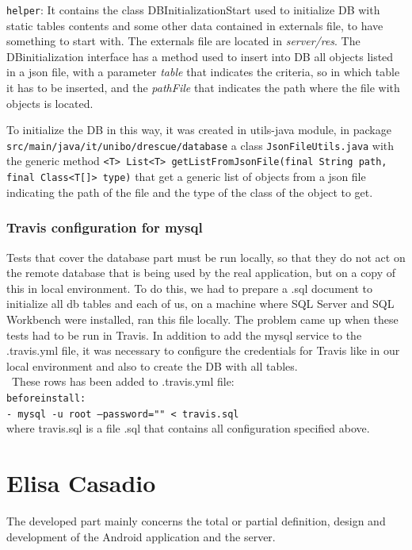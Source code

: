 \documentclass[a4paper,12pt]{report}
\begin{document}
\texttt{helper}: It contains the class DBInitializationStart used to initialize DB with static tables contents and some other data contained in externals file, to have something to start with.
The externals file are located in \textit{server/res}. The DBinitialization interface has a method used to insert into DB all objects listed in a json file, with a parameter \textit{table} that indicates the criteria, so in which table it has to be inserted, and the \textit{pathFile} that indicates the path where the file with objects is located.

To initialize the DB in this way, it was created in utils-java module, in package \texttt{src/main/java/it/unibo/drescue/database} a class \texttt{JsonFileUtils.java} with the generic method \texttt{<T> List<T> getListFromJsonFile(final String path, \\final Class<T[]> type)} that get a generic list of objects from a json file indicating the path of the file and the type of the class of the object to get.

\subsubsection{Travis configuration for mysql}
Tests that cover the database part must be run locally, so that they do not act on the remote database that is being used by the real application, but on a copy of this in local environment.
To do this, we had to prepare a .sql document to initialize all db tables and each of us, on a machine where SQL Server and SQL Workbench were installed, ran this file locally.
The problem came up when these tests had to be run in Travis. In addition to add the mysql service to the .travis.yml file, it was necessary to configure the credentials for Travis like in our local environment and also to create the DB with all tables. \\\
These rows has been added to .travis.yml file:\\
\texttt{before}\textunderscore\texttt{install:}\\
\texttt{- mysql -u root --password="" < travis.sql}
\\where travis.sql is a file .sql that contains all configuration specified above.

\section{Elisa Casadio}
The developed part mainly concerns the total or partial definition, design and development of the Android application and the server.
\end{document}
